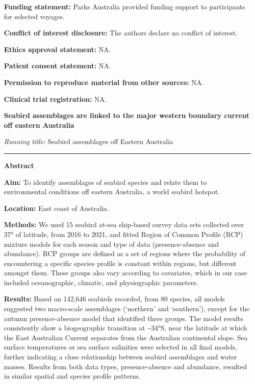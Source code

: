 \documentclass{article}
\begin{document}
\textbf{Funding statement:} Parks Australia provided funding support to participants for selected voyages.

\textbf{Conflict of interest disclosure:} The authors declare no conflict of interest.

\textbf{Ethics approval statement:} NA.

\textbf{Patient consent statement:} NA.

\textbf{Permission to reproduce material from other sources:} NA.

\textbf{Clinical trial registration:} NA.

\newpage

\begin{linenumbers}

\begin{center}
\textbf{Seabird assemblages are linked to the major western boundary current off eastern Australia}
\end{center}

\emph{Running title:} Seabird assemblages off Eastern Australia

\begin{center}\rule{0.5\linewidth}{0.5pt}\end{center}

\textbf{Abstract}

\textbf{Aim:} To identify assemblages of seabird species and relate them to environmental conditions off eastern Australia, a world seabird hotspot.

\textbf{Location:} East coast of Australia.

\textbf{Methods:} We used 15 seabird at-sea ship-based survey data sets collected over 37° of latitude, from 2016 to 2021, and fitted Region of Common Profile (RCP) mixture models for each season and type of data (presence-absence and abundance). RCP groups are defined as a set of regions where the probability of encountering a specific species profile is constant within regions, but different amongst them. These groups also vary according to covariates, which in our case included oceanographic, climatic, and physiographic parameters.

\textbf{Results:} Based on 142,646 seabirds recorded, from 80 species, all models suggested two macro-scale assemblages (`northern' and `southern'), except for the autumn presence-absence model that identified three groups. The model results consistently show a biogeographic transition at \textasciitilde34°S, near the latitude at which the East Australian Current separates from the Australian continental slope. Sea surface temperatures or sea surface salinities were selected in all final models, further indicating a close relationship between seabird assemblages and water masses. Results from both data types, presence-absence and abundance, resulted in similar spatial and species profile patterns.


\end{linenumbers}
\end{document}

